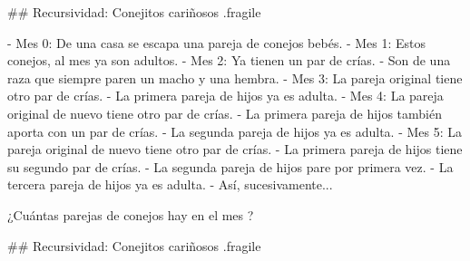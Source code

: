 ## Recursividad: Conejitos cariñosos {.fragile}


\vspace{-2ex}

- Mes 0: De una casa se escapa una pareja de conejos bebés.
- Mes 1: Estos conejos, al mes ya son adultos.
- Mes 2: Ya tienen un par de crías.
    - Son de una raza que siempre paren un macho y una hembra.
- Mes 3: La pareja original tiene otro par de crías.
    - La primera pareja de hijos ya es adulta.
- Mes 4: La pareja original de nuevo tiene otro par de crías.
    - La primera pareja de hijos también aporta con un par de crías.
    - La segunda pareja de hijos ya es adulta.
- Mes 5: La pareja original de nuevo tiene otro par de crías.
    - La primera pareja de hijos tiene su segundo par de crías.
    - La segunda pareja de hijos pare por primera vez.
    - La tercera pareja de hijos ya es adulta.
- Así, sucesivamente...

\bgnblocknormal
¿Cuántas parejas de conejos hay en el mes ?
\trmblocknormal


## Recursividad: Conejitos cariñosos {.fragile}

